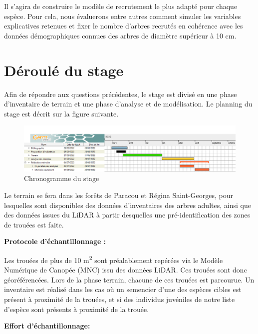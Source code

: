 \documentclass[
  12pt,
  american,
  a4paper,
  extrafontsizes,onecolumn,openright
  ]{memoir}
\begin{document}
Il s'agira de construire le modèle de recrutement le plus adapté pour chaque espèce. Pour cela, nous évaluerons entre autres comment simuler les variables explicatives retenues et fixer le nombre d'arbres recrutés en cohérence avec les données démographiques connues des arbres de diamètre supérieur à 10 cm.

\hypertarget{duxe9rouluxe9-du-stage}{%
\section{Déroulé du stage}\label{duxe9rouluxe9-du-stage}}

Afin de répondre aux questions précédentes, le stage est divisé en une phase d'inventaire de terrain et une phase d'analyse et de modélisation. Le planning du stage est décrit sur la figure suivante.

\scriptsize

\begin{figure}

{\centering \includegraphics[width=1\linewidth]{images/chronogramme} 

}

\caption{Chronogramme du stage}\label{fig:planning}
\end{figure}

\normalsize

Le terrain se fera dans les forêts de Paracou et Régina Saint-Georges, pour lesquelles sont disponibles des données d'inventaires des arbres adultes, ainsi que des données issues du LiDAR à partir desquelles une pré-identification des zones de trouées est faite.

\textbf{Protocole d'échantillonnage :}

Les trouées de plus de 10 m\textsuperscript{2} sont préalablement repérées via le Modèle Numérique de Canopée (MNC) issu des données LiDAR. Ces trouées sont donc géoréférencées. Lors de la phase terrain, chacune de ces trouées est parcourue. Un inventaire est réalisé dans les cas où un semencier d'une des espèces cibles est présent à proximité de la trouées, et si des individus juvéniles de notre liste d'espèce sont présents à proximité de la trouée.

\textbf{Effort d'échantillonnage:}
\end{document}
